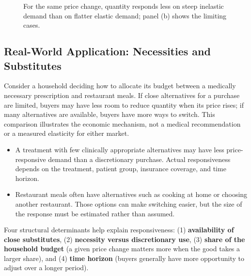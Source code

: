 \documentclass[11pt,letterpaper]{article}
\begin{document}
\begin{figure}[htbp]
\caption{For the same price change, quantity responds less on steep inelastic demand than on flatter elastic demand; panel (b) shows the limiting cases.}
\label{fig:elasticity_regimes}
\end{figure}

\subsection*{Real-World Application: Necessities and Substitutes}
Consider a household deciding how to allocate its budget between a medically necessary prescription and restaurant meals. If close alternatives for a purchase are limited, buyers may have less room to reduce quantity when its price rises; if many alternatives are available, buyers have more ways to switch. This comparison illustrates the economic mechanism, not a medical recommendation or a measured elasticity for either market.
\begin{itemize}
    \item A treatment with few clinically appropriate alternatives may have less price-responsive demand than a discretionary purchase. Actual responsiveness depends on the treatment, patient group, insurance coverage, and time horizon.
    \item Restaurant meals often have alternatives such as cooking at home or choosing another restaurant. Those options can make switching easier, but the size of the response must be estimated rather than assumed.
\end{itemize}
Four structural determinants help explain responsiveness: (1) \textbf{availability of close substitutes}, (2) \textbf{necessity versus discretionary use}, (3) \textbf{share of the household budget} (a given price change matters more when the good takes a larger share), and (4) \textbf{time horizon} (buyers generally have more opportunity to adjust over a longer period).
\end{document}
